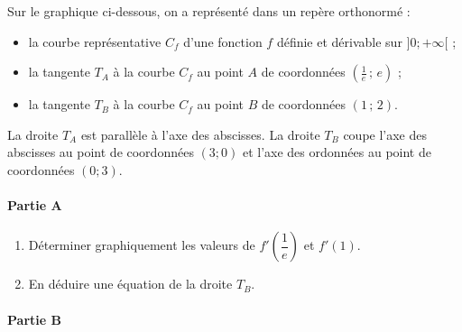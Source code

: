 \documentclass[11pt,fleqn, openany]{book} %
\begin{document}
\begin{exercise}[subtitle={(Sujet zéro 2021)}]

Sur le graphique ci-dessous, on a représenté dans un repère orthonormé :
\begin{itemize}
\item la courbe représentative $C_f$ d'une fonction $f$ définie et dérivable sur $]0 ; +\infty[$ ;
\item la tangente $T_A$ à la courbe $C_f$ au point $A$ de coordonnées $\left(\frac{1}{e}\,;\,e\right)$ ;
\item la tangente $T_B$ à la courbe $C_f$ au point $B$ de coordonnées $\left(1\,;\,2\right)$.\end{itemize}
La droite $T_A$ est parallèle à l'axe des abscisses. La droite $T_B$ coupe l'axe des abscisses au point de coordonnées $(3 ; 0)$ et l'axe des ordonnées au point de coordonnées $(0 ; 3)$.

\begin{center}
\end{center}

\paragraph{Partie A}

\begin{enumerate}
\item Déterminer graphiquement les valeurs de $f'\left(\dfrac{1}{e}\right)$ et $f'(1)$.
\item En déduire une équation de la droite $T_B$.
\end{enumerate}

\paragraph{Partie B}


\end{exercise}
\end{document}
